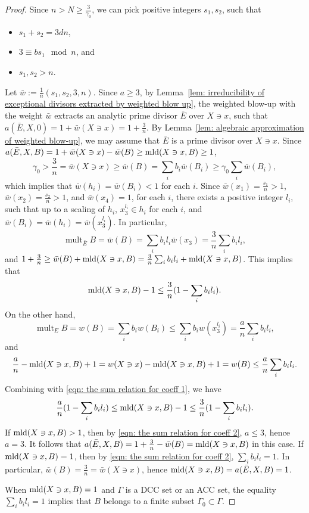 \documentclass[11pt]{amsart}
\numberwithin{equation}{section}
\newcommand{\mld}{{\rm{mld}}}
\newcommand{\mult}{\operatorname{mult}}
\theoremstyle{definition}
\theoremstyle{definition}
\begin{document}
\begin{proof}
Since $n>N\geq \frac{3}{\gamma_0}$, we can pick positive integers $s_1,s_2$, such that
\begin{itemize}
    \item $s_1+s_2=3dn$,
    \item $3\equiv bs_1\mod n$, and
    \item $s_1,s_2>n$.
\end{itemize}
Let $\bar w:=\frac{1}{n}(s_1,s_2,3,n)$. Since $a\geq 3$, by Lemma~\ref{lem: irreducibility of exceptional divisors extracted by weighted blow up}, the weighted blow-up with the weight $\bar w$ extracts an analytic prime divisor $\bar E$ over $X\ni x$, such that $a(\bar E,X,0)=1+\bar w(X\ni x)=1+\frac{3}{n}$. By Lemma~\ref{lem: algebraic approximation of weighted blow-up}, we may assume that $\bar E$ is a prime divisor over $X\ni x$. Since $a(\bar{E},X,B)=1+\bar w(X\ni x)-\bar{w}(B)\geq \mld(X\ni x, B)\geq 1$, $$\gamma_0>\frac{3}{n}=\bar w(X\ni x)\geq \bar w(B)= \sum_{i} b_i\bar w(B_i)\geq\gamma_0\sum_{i}\bar w(B_i),$$
which implies that $\bar w(h_i)=\bar w(B_i)<1$ for each $i$.
Since $\bar w(x_1)=\frac{s_1}{n}>1$, $\bar w(x_2)=\frac{s_2}{n}>1$, and $\bar w(x_4)=1$, for each $i$, there exists a positive integer $l_i$, such that up to a scaling of $h_i$, $x_3^{l_i}\in h_i$ for each $i$, and $\bar{w}(B_i)=\bar w(h_i)=\bar w(x_3^{l_i})$. In particular, 
$$\mult_{\bar E} B=\bar w(B)=\sum_{i} b_il_i\bar w(x_3)=\frac{3}{n}\sum_{i} b_il_i,$$ 
and $1+\frac{3}{n}\geq\bar w(B)+\mld(X\ni x,B)=\frac{3}{n}\sum_{i} b_il_i+\mld(X\ni x,B)$. This implies that
\begin{align}\label{eqn: the sum relation for coeff 1}
\mld(X\ni x,B)-1\leq \frac{3}{n}(1-\sum_{i} b_il_i).
\end{align}
On the other hand, 
$$\mult_E B=w(B)=\sum_{i} b_iw(B_i)\leq\sum_{i} b_iw(x_3^{l_i})=\frac{a}{n}\sum_{i} b_il_i,$$ 
and
$$\frac{a}{n}-\mld(X\ni x,B)+1=w(X\ni x)-\mld(X\ni x,B)+1=w(B)\leq\frac{a}{n}\sum_{i} b_il_i.$$
Combining with \eqref{eqn: the sum relation for coeff 1}, we have
\begin{align}\label{eqn: the sum relation for coeff 2}
\frac{a}{n}(1-\sum_{i} b_il_i)\leq \mld(X\ni x,B)-1\leq \frac{3}{n}(1-\sum_{i} b_il_i).
\end{align}
If $\mld(X\ni x, B)>1$, then by \eqref{eqn: the sum relation for coeff 2}, $a\leq 3$, hence $a=3$. It follows that $a(\bar E,X,B)=1+\frac{3}{n}-\bar w(B)=\mld(X\ni x, B)$ in this case. If $\mld(X\ni x, B)=1$, then by \eqref{eqn: the sum relation for coeff 2}, $\sum_{i} b_il_i=1$. In particular, $\bar{w}(B)=\frac{3}{n}=\bar{w}(X\ni x)$, hence $\mld(X\ni x,B)=a(\bar{E},X,B)=1$.

\medskip

When $\mld(X\ni x, B)=1$ and $\Gamma$ is a DCC set or an ACC set, the equality $\sum_{i} b_il_i=1$ implies that $B$ belongs to a finite subset $\Gamma_0\subset \Gamma$.
\end{proof}
\end{document}
